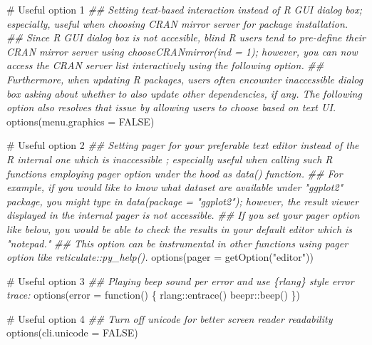 \documentclass[
  letterpaper,
  DIV=11,
  numbers=noendperiod]{scrartcl}
\newenvironment{Shaded}{\begin{snugshade}}{\end{snugshade}}
\newcommand{\AttributeTok}[1]{\textcolor[rgb]{0.40,0.45,0.13}{#1}}
\newcommand{\CommentTok}[1]{\textcolor[rgb]{0.37,0.37,0.37}{#1}}
\newcommand{\ConstantTok}[1]{\textcolor[rgb]{0.56,0.35,0.01}{#1}}
\newcommand{\ControlFlowTok}[1]{\textcolor[rgb]{0.00,0.23,0.31}{#1}}
\newcommand{\DocumentationTok}[1]{\textcolor[rgb]{0.37,0.37,0.37}{\textit{#1}}}
\newcommand{\FunctionTok}[1]{\textcolor[rgb]{0.28,0.35,0.67}{#1}}
\newcommand{\NormalTok}[1]{\textcolor[rgb]{0.00,0.23,0.31}{#1}}
\newcommand{\SpecialCharTok}[1]{\textcolor[rgb]{0.37,0.37,0.37}{#1}}
\newcommand{\StringTok}[1]{\textcolor[rgb]{0.13,0.47,0.30}{#1}}
\begin{document}
\begin{Shaded}
\begin{Highlighting}[]
\CommentTok{\# Useful option 1}
\DocumentationTok{\#\# Setting text{-}based interaction instead of R GUI dialog box; especially, useful when choosing CRAN mirror server for package installation.}
\DocumentationTok{\#\# Since R GUI dialog box is not accesible, blind R users tend to pre{-}define their CRAN mirror server using \textasciigrave{}chooseCRANmirror(ind = 1)\textasciigrave{}; however, you can now access the CRAN server list interactively using the following option.}
\DocumentationTok{\#\# Furthermore, when updating R packages, users often encounter inaccessible dialog box asking about whether to also update other dependencies, if any. The following option also resolves that issue by allowing users to choose based on text UI.}
\FunctionTok{options}\NormalTok{(}\AttributeTok{menu.graphics =} \ConstantTok{FALSE}\NormalTok{)}

\CommentTok{\# Useful option 2}
\DocumentationTok{\#\# Setting pager for your preferable text editor instead of the R internal one which is inaccessible ; especially useful when calling such R functions employing pager option under the hood as \textasciigrave{}data()\textasciigrave{} function.}
\DocumentationTok{\#\# For example, if you would like to know what dataset are available under "ggplot2" package, you might type in \textasciigrave{}data(package = "ggplot2")\textasciigrave{}; however, the result viewer displayed in the internal pager is not accessible.}
\DocumentationTok{\#\# If you set your pager option like below, you would be able to check the results in your default editor which is "notepad."}
\DocumentationTok{\#\# This option can be instrumental in other functions using pager option like \textasciigrave{}reticulate::py\_help()\textasciigrave{}.}
\FunctionTok{options}\NormalTok{(}\AttributeTok{pager =} \FunctionTok{getOption}\NormalTok{(}\StringTok{"editor"}\NormalTok{))}

\CommentTok{\# Useful option 3}
\DocumentationTok{\#\# Playing beep sound per error and use \{rlang\} style error trace:}
\FunctionTok{options}\NormalTok{(}\AttributeTok{error =} \ControlFlowTok{function}\NormalTok{() \{}
\NormalTok{  rlang}\SpecialCharTok{::}\FunctionTok{entrace}\NormalTok{()}
\NormalTok{  beepr}\SpecialCharTok{::}\FunctionTok{beep}\NormalTok{()}
\NormalTok{\})}

\CommentTok{\# Useful option 4}
\DocumentationTok{\#\# Turn off unicode for better screen reader readability}
\FunctionTok{options}\NormalTok{(}\AttributeTok{cli.unicode =} \ConstantTok{FALSE}\NormalTok{)}


\end{Highlighting}
\end{Shaded}
\end{document}
